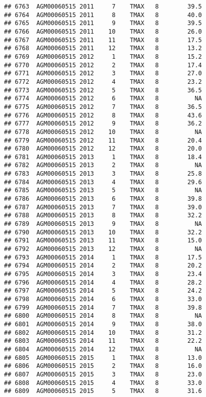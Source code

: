 \documentclass{article}\usepackage[]{graphicx}\usepackage[]{color}
\makeatletter
\newenvironment{kframe}{%
 \def\at@end@of@kframe{}%
 \ifinner\ifhmode%
  \def\at@end@of@kframe{\end{minipage}}%
  \begin{minipage}{\columnwidth}%
 \fi\fi%
 \def\FrameCommand##1{\hskip\@totalleftmargin \hskip-\fboxsep
 \colorbox{shadecolor}{##1}\hskip-\fboxsep
     \hskip-\linewidth \hskip-\@totalleftmargin \hskip\columnwidth}%
 \MakeFramed {\advance\hsize-\width
   \@totalleftmargin\z@ \linewidth\hsize
   \@setminipage}}%
 {\par\unskip\endMakeFramed%
 \at@end@of@kframe}
\newenvironment{knitrout}{}{} %
\makeatother
\begin{document}
\begin{knitrout}
\begin{kframe}
\begin{verbatim}
## 6763  AGM00060515 2011     7    TMAX   8        39.5
## 6764  AGM00060515 2011     8    TMAX   8        40.0
## 6765  AGM00060515 2011     9    TMAX   8        39.5
## 6766  AGM00060515 2011    10    TMAX   8        26.0
## 6767  AGM00060515 2011    11    TMAX   8        17.5
## 6768  AGM00060515 2011    12    TMAX   8        13.2
## 6769  AGM00060515 2012     1    TMAX   8        15.2
## 6770  AGM00060515 2012     2    TMAX   8        17.4
## 6771  AGM00060515 2012     3    TMAX   8        27.0
## 6772  AGM00060515 2012     4    TMAX   8        23.2
## 6773  AGM00060515 2012     5    TMAX   8        36.5
## 6774  AGM00060515 2012     6    TMAX   8          NA
## 6775  AGM00060515 2012     7    TMAX   8        36.5
## 6776  AGM00060515 2012     8    TMAX   8        43.6
## 6777  AGM00060515 2012     9    TMAX   8        36.2
## 6778  AGM00060515 2012    10    TMAX   8          NA
## 6779  AGM00060515 2012    11    TMAX   8        20.4
## 6780  AGM00060515 2012    12    TMAX   8        20.0
## 6781  AGM00060515 2013     1    TMAX   8        18.4
## 6782  AGM00060515 2013     2    TMAX   8          NA
## 6783  AGM00060515 2013     3    TMAX   8        25.8
## 6784  AGM00060515 2013     4    TMAX   8        29.6
## 6785  AGM00060515 2013     5    TMAX   8          NA
## 6786  AGM00060515 2013     6    TMAX   8        39.8
## 6787  AGM00060515 2013     7    TMAX   8        39.0
## 6788  AGM00060515 2013     8    TMAX   8        32.2
## 6789  AGM00060515 2013     9    TMAX   8          NA
## 6790  AGM00060515 2013    10    TMAX   8        32.2
## 6791  AGM00060515 2013    11    TMAX   8        15.0
## 6792  AGM00060515 2013    12    TMAX   8          NA
## 6793  AGM00060515 2014     1    TMAX   8        17.5
## 6794  AGM00060515 2014     2    TMAX   8        20.2
## 6795  AGM00060515 2014     3    TMAX   8        23.4
## 6796  AGM00060515 2014     4    TMAX   8        28.2
## 6797  AGM00060515 2014     5    TMAX   8        24.2
## 6798  AGM00060515 2014     6    TMAX   8        33.0
## 6799  AGM00060515 2014     7    TMAX   8        39.8
## 6800  AGM00060515 2014     8    TMAX   8          NA
## 6801  AGM00060515 2014     9    TMAX   8        38.0
## 6802  AGM00060515 2014    10    TMAX   8        31.2
## 6803  AGM00060515 2014    11    TMAX   8        22.2
## 6804  AGM00060515 2014    12    TMAX   8          NA
## 6805  AGM00060515 2015     1    TMAX   8        13.0
## 6806  AGM00060515 2015     2    TMAX   8        16.0
## 6807  AGM00060515 2015     3    TMAX   8        23.0
## 6808  AGM00060515 2015     4    TMAX   8        33.0
## 6809  AGM00060515 2015     5    TMAX   8        31.6

\end{verbatim}
\end{kframe}
\end{knitrout}
\end{document}
